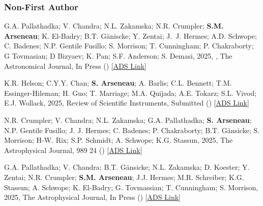 \documentclass[12pt,letterpaper]{article}
\begin{document}
\subsubsection{Non-First Author}
\begin{list}{}{\cvlist}
  \item[{\color{numcolor}\scriptsize10}] G.A. Pallathadka; V. Chandra; N.L. Zakamska; N.R. Crumpler; \textbf{S.M. Arseneau}; K. El-Badry; B.T. G\"aniscke; Y. Zentai; J.~J. Hermes; A.D. Schwope; C. Badenes; N.P. Gentile Fusillo; S. Morrison; T. Cunningham; P. Chakraborty; G Tovmasian; D Bizyaev; K. Pan; S.F. Anderson; S. Demasi, 2025, , The Astronomical Journal, In Press () [\href{https://ui.adsabs.harvard.edu/abs/2025arXiv250902906A}{ADS Link}]
  
  \item[{\color{numcolor}\scriptsize9}] K.R. Helson; C.Y.Y. Chan; \textbf{S. Arseneau}; A. Barlis; C.L. Bennett; T.M. Essinger-Hileman; H. Guo; T. Marriage; M.A. Quijada; A.E. Tokarz; S.L. Vivod; E.J. Wollack, 2025,  Review of Scientific Instruments, Submitted () [\href{https://ui.adsabs.harvard.edu/abs/2025arXiv250820406H}{ADS Link}]
  
  \item[{\color{numcolor}\scriptsize8}] N.R. Crumpler; V. Chandra; N.L. Zakamska; G.A. Pallathadka; \textbf{S. Arseneau}; N.P. Gentile Fusillo; J. J. Hermes; C. Badenes; P. Chakraborty; B.T. G\"ansicke; S. Morrison; H-W. Rix; S.P. Schmidt; A. Schwope; K.G. Stassun, 2025,  The Astrophysical Journal, 989 24 () [\href{https://ui.adsabs.harvard.edu/abs/2025ApJ...989...24C/abstract}{ADS Link}]
  
  \item[{\color{numcolor}\scriptsize7}] G.A. Pallathadka; V. Chandra; B.T. G\"ansicke; N.L. Zakamska; D. Koester; Y. Zentai; N.R. Crumpler; \textbf{S.M. Arseneau}; J.J. Hermes; M.R. Schreiber; K.G. Stassun; A. Schwope; K. El-Badry; G. Tovmassian; T. Cunningham; S. Morrison, 2025,  The Astrophysical Journal, In Press () [\href{https://ui.adsabs.harvard.edu/abs/2025arXiv250711618A}{ADS Link}]
  

\end{list}
\end{document}
